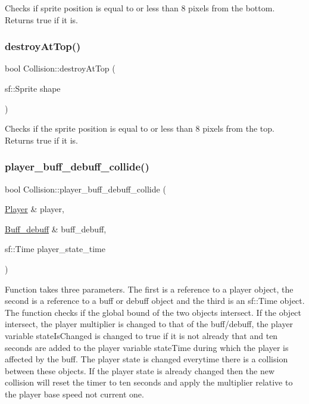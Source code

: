 Checks if sprite position is equal to or less than 8 pixels from the bottom. Returns true if it is. \mbox{\label{classCollision_a0a0e86390b15d8d745de4cf3707ced9d}} 
\subsubsection{\texorpdfstring{destroy\+At\+Top()}{destroyAtTop()}}
{\footnotesize\ttfamily bool Collision\+::destroy\+At\+Top (\begin{DoxyParamCaption}\item[{sf\+::\+Sprite}]{shape }\end{DoxyParamCaption})}

Checks if the sprite position is equal to or less than 8 pixels from the top. Returns true if it is. \mbox{\label{classCollision_ace87dc1e8d64435fda445f324b41fd58}} 
\subsubsection{\texorpdfstring{player\+\_\+buff\+\_\+debuff\+\_\+collide()}{player\_buff\_debuff\_collide()}}
{\footnotesize\ttfamily bool Collision\+::player\+\_\+buff\+\_\+debuff\+\_\+collide (\begin{DoxyParamCaption}\item[{\hyperlink{classPlayer}{Player} \&}]{player,  }\item[{\hyperlink{classBuff__debuff}{Buff\+\_\+debuff} \&}]{buff\+\_\+debuff,  }\item[{sf\+::\+Time}]{player\+\_\+state\+\_\+time }\end{DoxyParamCaption})}

Function takes three parameters. The first is a reference to a player object, the second is a reference to a buff or debuff object and the third is an sf\+::\+Time object. The function checks if the global bound of the two objects intersect. If the object intersect, the player multiplier is changed to that of the buff/debuff, the player variable state\+Is\+Changed is changed to true if it is not already that and ten seconds are added to the player variable state\+Time during which the player is affected by the buff. The player state is changed everytime there is a collision between these objects. If the player state is already changed then the new collision will reset the timer to ten seconds and apply the multiplier relative to the player base speed not current one. \mbox{\label{classCollision_a850f6ea5287cf6b2dd6765f5f9684cd5}} 
